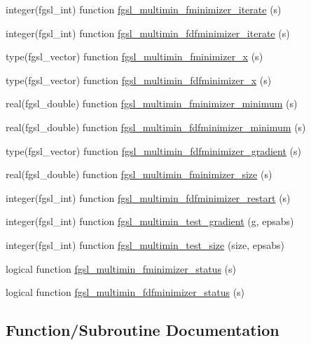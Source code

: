 \begin{DoxyCompactItemize}
\item 
integer(fgsl\+\_\+int) function \hyperlink{multimin_8finc_a3197995b850d60e0de902fe245d48bbf}{fgsl\+\_\+multimin\+\_\+fminimizer\+\_\+iterate} (s)
\item 
integer(fgsl\+\_\+int) function \hyperlink{multimin_8finc_ae967ca17e87c39eb2a545c1d710fe3d2}{fgsl\+\_\+multimin\+\_\+fdfminimizer\+\_\+iterate} (s)
\item 
type(fgsl\+\_\+vector) function \hyperlink{multimin_8finc_aa4a9a06fe53544147e23f4c398ea2e3b}{fgsl\+\_\+multimin\+\_\+fminimizer\+\_\+x} (s)
\item 
type(fgsl\+\_\+vector) function \hyperlink{multimin_8finc_a649ffffde4ac9b8567d02ebb30c679b4}{fgsl\+\_\+multimin\+\_\+fdfminimizer\+\_\+x} (s)
\item 
real(fgsl\+\_\+double) function \hyperlink{multimin_8finc_ad82b7976f803bf75a8b762911897a91d}{fgsl\+\_\+multimin\+\_\+fminimizer\+\_\+minimum} (s)
\item 
real(fgsl\+\_\+double) function \hyperlink{multimin_8finc_af074a3128839c747e32a80d7f76ced48}{fgsl\+\_\+multimin\+\_\+fdfminimizer\+\_\+minimum} (s)
\item 
type(fgsl\+\_\+vector) function \hyperlink{multimin_8finc_a831cbe6619ed7b76ae8fe07a2ab3f40b}{fgsl\+\_\+multimin\+\_\+fdfminimizer\+\_\+gradient} (s)
\item 
real(fgsl\+\_\+double) function \hyperlink{multimin_8finc_a78f3abf88b0093e4ca69305e85a78253}{fgsl\+\_\+multimin\+\_\+fminimizer\+\_\+size} (s)
\item 
integer(fgsl\+\_\+int) function \hyperlink{multimin_8finc_ad3a5ccbcbb3cc2029b4790950badeace}{fgsl\+\_\+multimin\+\_\+fdfminimizer\+\_\+restart} (s)
\item 
integer(fgsl\+\_\+int) function \hyperlink{multimin_8finc_ad819b0b49a64995965d3abd7f66f4847}{fgsl\+\_\+multimin\+\_\+test\+\_\+gradient} (g, epsabs)
\item 
integer(fgsl\+\_\+int) function \hyperlink{multimin_8finc_ad9f121a576bee6afbab5fa3c6f8ab5b4}{fgsl\+\_\+multimin\+\_\+test\+\_\+size} (size, epsabs)
\item 
logical function \hyperlink{multimin_8finc_a1a6c440240f101bf70933e5f7a7338ba}{fgsl\+\_\+multimin\+\_\+fminimizer\+\_\+status} (s)
\item 
logical function \hyperlink{multimin_8finc_a39893d424d6495e73046ec17b1c58e69}{fgsl\+\_\+multimin\+\_\+fdfminimizer\+\_\+status} (s)
\end{DoxyCompactItemize}


\subsection{Function/\+Subroutine Documentation}
\hypertarget{multimin_8finc_a4e93d6fb4c774ef02bc0e256fc74f3cf}{}
